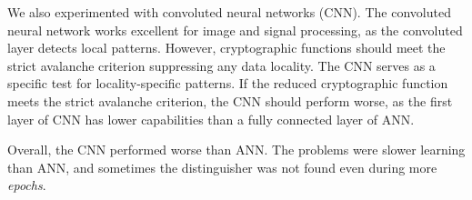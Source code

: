 \documentclass[
  print, %
  Table,   %
  nolof,     %
  nolot,     %
  11pt, %
  oneside  %
]{fithesis3}
\begin{document}
We also experimented with convoluted neural networks (CNN). The convoluted neural network works excellent for image and signal processing, as the convoluted layer detects local patterns. However, cryptographic functions should meet the strict avalanche criterion suppressing any data locality. The CNN serves as a specific test for locality-specific patterns. If the reduced cryptographic function meets the strict avalanche criterion, the CNN should perform worse, as the first layer of CNN has lower capabilities than a fully connected layer of ANN.

Overall, the CNN performed worse than ANN. The problems were slower learning than ANN, and sometimes the distinguisher was not found even during more \textit{epochs}.





\end{document}
